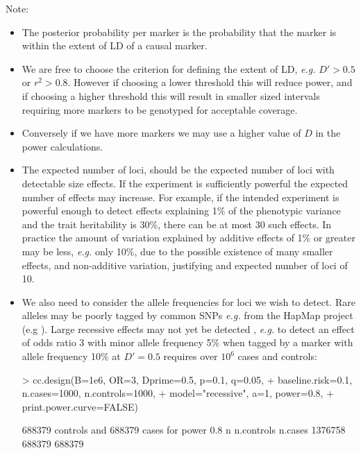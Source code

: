 \documentclass[a4paper,10pt]{amsart}
\def\eg{\textit{e.g.}}
\begin{document}
Note:
\begin{itemize}
\item The posterior probability per marker is the probability that the marker
is within the extent of LD of a causal marker.

\item We are free to choose the criterion for defining the extent of LD,
\eg{} $D'> 0.5$ or $r^2 > 0.8$. However if choosing a lower threshold
this will reduce power, and if choosing a higher threshold this will
result in smaller sized intervals requiring more markers to be
genotyped for acceptable coverage.
\item Conversely if we have more markers we may use a higher value of $D$ 
in the power calculations.
\item The expected number of loci, should be the expected number of
  loci with detectable size effects. If the experiment is sufficiently
  powerful the expected number of effects may increase. For example, if the
  intended experiment is powerful enough to detect effects explaining 1\% of
  the phenotypic variance and the trait heritability is 30\%, there
  can be at most 30 such effects. In practice the amount of variation
  explained by additive effects of 1\% or greater may be less,
  \eg{} only 10\%, due to the possible existence of many smaller
  effects, and non-additive variation, justifying and expected number of loci
  of 10.
\item We also need to consider the allele frequencies for loci we wish
  to detect. Rare alleles may be poorly tagged by common SNPs
  \eg{} from the HapMap project  (e.g
  \cite{YangetalcommonSNPs2010}).  Large recessive effects may not yet
  be detected \cite{Ball2011exptdesigngwcc}, \eg{}  to detect an effect
  of odds ratio 3 with minor allele frequency 5\% when tagged by a
  marker with allele frequency 10\% at $D'=0.5$ requires over $10^6$
  cases and controls: 
\begin{Schunk}
\begin{Sinput}
> cc.design(B=1e6, OR=3, Dprime=0.5, p=0.1, q=0.05, 
+           baseline.risk=0.1, n.cases=1000, n.controls=1000,
+           model="recessive", a=1, power=0.8, 
+           print.power.curve=FALSE) 
\end{Sinput}
\begin{Soutput}
688379 controls and 688379 cases for power 0.8 
         n n.controls    n.cases 
   1376758     688379     688379 
\end{Soutput}
\end{Schunk}
\end{itemize}
\end{document}
